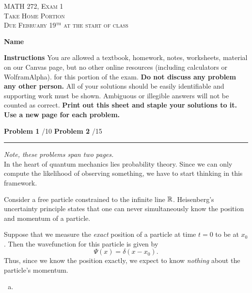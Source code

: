 \documentclass[12pt]{amsbook}
\begin{document}

\begin{center}
   \textsc{\large MATH 272, Exam 1}\\
   \textsc{Take Home Portion}\\
   \textsc{Due February 19$^\textrm{th}$ at the start of class}
\end{center}
\vspace{1cm}

\noindent\textbf{Name} \; \underline{\hspace{8cm}}

\vspace{1cm}

\noindent\textbf{Instructions} \; You are allowed a textbook, homework, notes, worksheets, material on our Canvas page, but no other online resources (including calculators or WolframAlpha). for this portion of the exam.  \textbf{Do not discuss any problem any other person.} All of your solutions should be easily identifiable and supporting work must be shown.  Ambiguous or illegible answers will not be counted as correct. \textbf{Print out this sheet and staple your solutions to it. Use a new page for each problem.}


\vspace{1cm}

\begin{center}\textbf{Problem 1} \; \underline{\hspace{1cm}}/10 \qquad \qquad \textbf{Problem 2} \; \underline{\hspace{1cm}}/15\end{center}

\vspace{1cm}

\hrule

\vspace*{1cm}
\noindent\emph{Note, these problems span two pages.}\\

In the heart of quantum mechanics lies probability theory.  Since we can only compute the likelihood of observing something, we have to start thinking in this framework. 

\newpage
\begin{problem}
Consider a free particle constrained to the infinite line $\mathbb{R}$.  Heisenberg's uncertainty principle states that one can never simultaneously know the position and momentum of a particle.  

Suppose that we measure the \emph{exact} position of a particle at time $t=0$ to be at $x_0$. Then the wavefunction for this particle is given by
\[
\Psi(x) = \delta(x-x_0).  
\]
Thus, since we know the position exactly, we expect to know \emph{nothing} about the particle's momentum. 
\begin{enumerate}[(a)]
	\item
\end{enumerate}
\end{problem}
\end{document}
